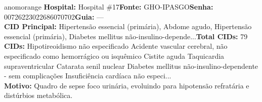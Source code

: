 \documentclass[a4paper,10pt]{article}
\begin{document}
\begin{anomalycard}[Interna\c{c}\~{a}o \#58 | Pac. \#102 | ALTO (z=3.11) | LOS: 3d | 03/03/2026\,$\to$\,06/03/2026]{anomorange}
\textbf{Hospital:} Hospital \#17\quad \textbf{Fonte:} GHO-IPASGO\quad \textbf{Senha:} 00726223022686070702\quad \textbf{Guia:} ---\\

\textbf{CID Principal:} {\small Hipertensão essencial (primária), Abdome agudo, Hipertensão essencial (primária), Diabetes mellitus não-insulino-depende...}\quad\textbf{Total CIDs:} 79\\

\textbf{CIDs:} {\scriptsize Hipotireoidismo não especificado \textbar{} Acidente vascular cerebral, não especificado como hemorrágico ou isquêmico \textbar{} Cistite aguda \textbar{} Taquicardia supraventricular \textbar{} Catarata senil nuclear \textbar{} Diabetes mellitus não-insulino-dependente - sem complicações \textbar{} Insuficiência cardíaca não especi...}\\

\textbf{Motivo:} {\scriptsize Quadro de sepse foco urinária,  evoluindo para hipotensão refratária  e distúrbios metabólica.}\\

\end{anomalycard}
\end{document}
